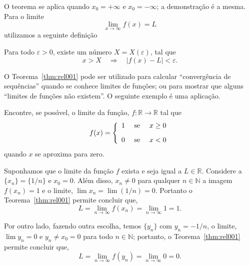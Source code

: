 \begin{note}
O teorema se aplica quando $x_0=+\infty$ e $x_0=-\infty$; a demonstra\c{c}\~{a}o \'{e} a mesma. Para o limite
\begin{equation*}
    \lim_{x\to \infty}f(x)=L
\end{equation*}
utilizamos a seguinte defini\c{c}\~{a}o
\end{note}

\begin{defi}
Para todo $\varepsilon>0$, existe um n\'{u}mero $X=X(\varepsilon)$, tal que
\begin{equation*}
    x> X\quad \Rightarrow \quad |f(x)-L|<\varepsilon.
\end{equation*}
\end{defi}

O Teorema~\ref{thm:rel001} pode ser utilizado para calcular ``converg\^{e}ncia de sequ\^{e}ncias'' quando se conhece limites de fun\c{c}\~{o}es; ou para mostrar que alguns ``limites de fun\c{c}\~{o}es n\~{a}o existem''. O seguinte exemplo \'{e} uma aplica\c{c}\~{a}o.


\begin{exer}
Encontre, se poss\'{\i}vel, o  limite da fun\c{c}\~{a}o, $f\colon \mathbb{R}\to \mathbb{R}$ tal que
\begin{equation*}
    f(x)=\left\{
           \begin{array}{ll}
             1 & \hbox{ se }\quad x\geq 0 \\[2ex]
             0 & \hbox{ se }\quad x<0
           \end{array}
         \right.
\end{equation*}
quando $x$ se aproxima para zero.
\end{exer}

\solo Suponhamos que o limite da fun\c{c}\~{a}o $f$ exista e seja igual a $L\in \mathbb{R}$. Considere 
a \seq $\{x_n\}=\{1/n\}$ e $x_0=0$. Al\'{e}m disso, $x_n\neq 0$ para qualquer $n\in \mathbb{N}$ a 
imagem $f(x_n)=1$ e o limite, $\lim x_n=\lim(1/n)=0$. Portanto o Teorema~\ref{thm:rel001} permite concluir que,
\begin{equation}\label{rel002}
    L=\lim_{n\to \infty} f(x_n)=\lim_{n\to \infty} 1=1.
\end{equation}

Por outro lado, fazendo outra escolha, temos $\{y_n\}$ com $y_n=-1/n$, o limite, $\lim y_n=0$ e 
$y_n \neq x_0=0$ para todo $n\in \mathbb{N}$; portanto, o Teorema~\ref{thm:rel001} permite concluir que,
\begin{equation*}
    L=\lim_{n\to\infty}f(y_n)=\lim_{n\to\infty} 0=0.
\end{equation*}


